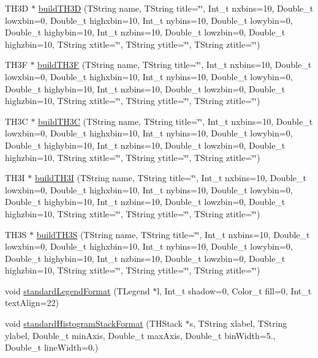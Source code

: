 \begin{DoxyCompactItemize}
\item 
T\+H3\+D $\ast$ \hyperlink{namespace_h_a_l_a67a00482fa3655efa73942e6970aa392}{build\+T\+H3\+D} (T\+String name, T\+String title=\char`\"{}\char`\"{}, Int\+\_\+t nxbins=10, Double\+\_\+t lowxbin=0, Double\+\_\+t highxbin=10, Int\+\_\+t nybins=10, Double\+\_\+t lowybin=0, Double\+\_\+t highybin=10, Int\+\_\+t nzbins=10, Double\+\_\+t lowzbin=0, Double\+\_\+t highzbin=10, T\+String xtitle=\char`\"{}\char`\"{}, T\+String ytitle=\char`\"{}\char`\"{}, T\+String ztitle=\char`\"{}\char`\"{})
\item 
T\+H3\+F $\ast$ \hyperlink{namespace_h_a_l_a6baf4beab40b4609a74ee985a3419f30}{build\+T\+H3\+F} (T\+String name, T\+String title=\char`\"{}\char`\"{}, Int\+\_\+t nxbins=10, Double\+\_\+t lowxbin=0, Double\+\_\+t highxbin=10, Int\+\_\+t nybins=10, Double\+\_\+t lowybin=0, Double\+\_\+t highybin=10, Int\+\_\+t nzbins=10, Double\+\_\+t lowzbin=0, Double\+\_\+t highzbin=10, T\+String xtitle=\char`\"{}\char`\"{}, T\+String ytitle=\char`\"{}\char`\"{}, T\+String ztitle=\char`\"{}\char`\"{})
\item 
T\+H3\+C $\ast$ \hyperlink{namespace_h_a_l_a2c6de3d3a250b42b193d2765171369cf}{build\+T\+H3\+C} (T\+String name, T\+String title=\char`\"{}\char`\"{}, Int\+\_\+t nxbins=10, Double\+\_\+t lowxbin=0, Double\+\_\+t highxbin=10, Int\+\_\+t nybins=10, Double\+\_\+t lowybin=0, Double\+\_\+t highybin=10, Int\+\_\+t nzbins=10, Double\+\_\+t lowzbin=0, Double\+\_\+t highzbin=10, T\+String xtitle=\char`\"{}\char`\"{}, T\+String ytitle=\char`\"{}\char`\"{}, T\+String ztitle=\char`\"{}\char`\"{})
\item 
T\+H3\+I $\ast$ \hyperlink{namespace_h_a_l_a38c9c193d1c35ee5435212eb15139e94}{build\+T\+H3\+I} (T\+String name, T\+String title=\char`\"{}\char`\"{}, Int\+\_\+t nxbins=10, Double\+\_\+t lowxbin=0, Double\+\_\+t highxbin=10, Int\+\_\+t nybins=10, Double\+\_\+t lowybin=0, Double\+\_\+t highybin=10, Int\+\_\+t nzbins=10, Double\+\_\+t lowzbin=0, Double\+\_\+t highzbin=10, T\+String xtitle=\char`\"{}\char`\"{}, T\+String ytitle=\char`\"{}\char`\"{}, T\+String ztitle=\char`\"{}\char`\"{})
\item 
T\+H3\+S $\ast$ \hyperlink{namespace_h_a_l_a6b6e1a59282418554b685f5bc92f30a6}{build\+T\+H3\+S} (T\+String name, T\+String title=\char`\"{}\char`\"{}, Int\+\_\+t nxbins=10, Double\+\_\+t lowxbin=0, Double\+\_\+t highxbin=10, Int\+\_\+t nybins=10, Double\+\_\+t lowybin=0, Double\+\_\+t highybin=10, Int\+\_\+t nzbins=10, Double\+\_\+t lowzbin=0, Double\+\_\+t highzbin=10, T\+String xtitle=\char`\"{}\char`\"{}, T\+String ytitle=\char`\"{}\char`\"{}, T\+String ztitle=\char`\"{}\char`\"{})
\item 
void \hyperlink{namespace_h_a_l_a12ef73e23316a2312276a7d1eee541bc}{standard\+Legend\+Format} (T\+Legend $\ast$l, Int\+\_\+t shadow=0, Color\+\_\+t fill=0, Int\+\_\+t text\+Align=22)
\item 
void \hyperlink{namespace_h_a_l_afcd03337b0d38ae35041d4ec4155c18a}{standard\+Histogram\+Stack\+Format} (T\+H\+Stack $\ast$s, T\+String xlabel, T\+String ylabel, Double\+\_\+t min\+Axis, Double\+\_\+t max\+Axis, Double\+\_\+t bin\+Width=5., Double\+\_\+t line\+Width=0.)
\end{DoxyCompactItemize}


